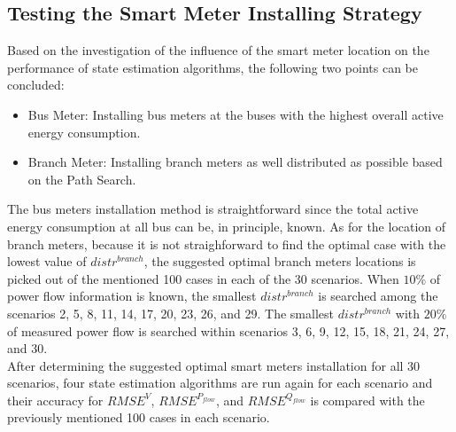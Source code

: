 \subsection{Testing the Smart Meter Installing Strategy}
Based on the investigation of the influence of the smart meter location on the performance of state estimation algorithms, the following two points can be concluded:
\begin{itemize}
    \item Bus Meter: Installing bus meters at the buses with the highest overall active energy consumption.

    \item Branch Meter: Installing branch meters as well distributed as possible based on the Path Search.
 
    
\end{itemize}
The bus meters installation method is straightforward since the total active energy consumption at all bus can be, in principle, known. As for the location of branch meters, because it is not straighforward to find the optimal case with the lowest value of $distr^{branch}$, the suggested optimal branch meters locations is picked out of the mentioned 100 cases in each of the 30 scenarios. When $10 \% $ of power flow information is known, the smallest $distr^{branch}$ is searched among the scenarios 2, 5, 8, 11, 14, 17, 20, 23, 26, and 29. The smallest $distr^{branch}$ with $20 \%$ of measured power flow is searched within scenarios 3, 6, 9, 12, 15, 18, 21, 24, 27, and 30.
\bigskip
\\After determining the suggested optimal smart meters installation for all 30 scenarios, four state estimation algorithms are run again for each scenario and their accuracy for $RMSE^V$, $RMSE^{P_{flow}}$, and $RMSE^{Q_{flow}}$ is compared with the previously mentioned 100 cases in each scenario.

